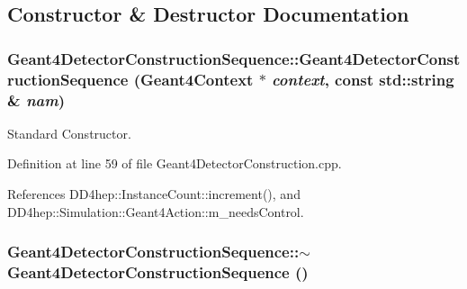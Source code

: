 \subsection{Constructor \& Destructor Documentation}
\hypertarget{class_d_d4hep_1_1_simulation_1_1_geant4_detector_construction_sequence_abd65d829a42c5d6e403349c9ffbb13d1}{
\subsubsection[{Geant4DetectorConstructionSequence}]{\setlength{\rightskip}{0pt plus 5cm}Geant4DetectorConstructionSequence::Geant4DetectorConstructionSequence ({\bf Geant4Context} $\ast$ {\em context}, \/  const std::string \& {\em nam})}}
\label{class_d_d4hep_1_1_simulation_1_1_geant4_detector_construction_sequence_abd65d829a42c5d6e403349c9ffbb13d1}


Standard Constructor. 

Definition at line 59 of file Geant4DetectorConstruction.cpp.

References DD4hep::InstanceCount::increment(), and DD4hep::Simulation::Geant4Action::m\_\-needsControl.\hypertarget{class_d_d4hep_1_1_simulation_1_1_geant4_detector_construction_sequence_a417d49c67bf4903def46532f17dd7d20}{
\subsubsection[{$\sim$Geant4DetectorConstructionSequence}]{\setlength{\rightskip}{0pt plus 5cm}Geant4DetectorConstructionSequence::$\sim$Geant4DetectorConstructionSequence ()}}
\label{class_d_d4hep_1_1_simulation_1_1_geant4_detector_construction_sequence_a417d49c67bf4903def46532f17dd7d20}



